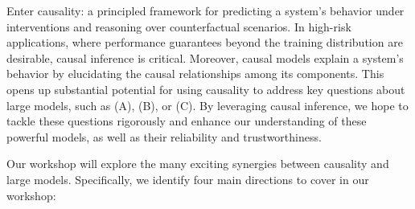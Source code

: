 \documentclass{article}
\begin{document}
Enter causality: a principled framework for predicting a system's behavior under interventions and reasoning over counterfactual scenarios.
In high-risk applications, where performance guarantees beyond the training distribution are desirable, causal inference is critical.
Moreover, causal models explain a system's behavior by elucidating the causal relationships among its components.
This opens up substantial potential for using causality to address key questions about large models, such as (A), (B), or (C). By leveraging causal inference, we hope to tackle these questions rigorously and enhance our understanding of these powerful models, as well as their reliability and trustworthiness.

\iffalse
Enter causality. Causal inference offers a framework to articulate questions like (A), (B), or (C), and provides tools to answer them in a systematic way. 
{\color{blue}[We believe that this has ... potential for ... addressing critical questions on large models.]}
It provides a principled framework for predicting a system's behavior under interventions and reasoning over counterfactual scenarios.
For example, by systematically identifying failure modes 
we can gain insights into the causal factors that govern the model's behavior.
This can be crucial 
{\color{blue}[aims to predict a system's behavior under manipulations or interventions, or in ... counterfactual scenarios ... interpretable and reliable ...]
On the one hand, [this is desirable in ... high-risk applications such as medical ...]. On the other hand, [it ..., robustness and trustworthiness guarantees].
]}
\fi



Our workshop will explore the many exciting synergies between causality and large models. 
Specifically, we identify four main directions to cover in our workshop: 
\end{document}
